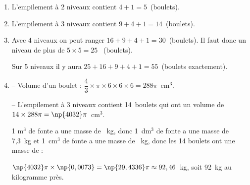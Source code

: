 \begin{enumerate}
	\item %
L'empilement à 2 niveaux contient $4 + 1 = 5$~(boulets).	
	\item %
L'empilement à 3 niveaux contient $9 + 4 + 1 = 14$~(boulets).
	\item %
Avec 4 niveaux on peut ranger $16 + 9 + 4 + 1 = 30$~(boulets). Il faut donc un niveau de plus de $5 \times 5 = 25$ ~(boulets).

Sur 5 niveaux il y aura $25 + 16 + 9 + 4 + 1 = 55$~(boulets exactement).
	\item %
-- Volume d'un boulet : $\dfrac{4}{3} \times \pi \times 6 \times 6 \times 6 = 288\pi$~cm$^3$.

-- L'empilement à 3 niveaux contient 14~boulets qui ont un volume de $14 \times 288\pi = \np{4032}\pi$~cm$^3$.

1 m$^3$ de fonte a une masse de ~kg, donc 1~dm$^3$ de fonte a une masse de 7,3~kg et 1~cm$^3$ de fonte a une masse de ~kg, donc les 14 boulets ont une masse de :

$\np{4032}\pi \times \np{0,0073}= \np{29,4336}\pi \approx 92,46$~kg, soit 92~kg au kilogramme près.
	
%	
	
\end{enumerate}
 
\vspace{0,5cm}

